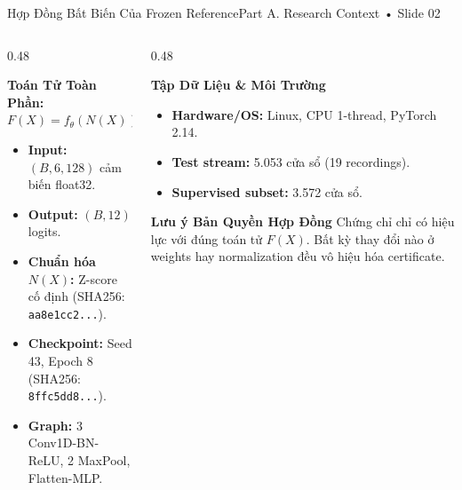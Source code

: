 \documentclass[aspectratio=169, 10pt]{beamer}
\begin{document}
\begin{frame}{Hợp Đồng Bất Biến Của Frozen Reference}{Part A. Research Context • Slide 02}
    \begin{columns}
        \begin{column}{0.48\textwidth}
            \begin{block}{\textbf{Toán Tử Toàn Phần: $F(X) = f_\theta(N(X))$}}
                \small
                \begin{itemize}
                    \item \textbf{Input:} $(B, 6, 128)$ cảm biến float32.
                    \item \textbf{Output:} $(B, 12)$ logits.
                    \item \textbf{Chuẩn hóa $N(X)$:} Z-score cố định (SHA256: \texttt{aa8e1cc2...}).
                    \item \textbf{Checkpoint:} Seed 43, Epoch 8 (SHA256: \texttt{8ffc5dd8...}).
                    \item \textbf{Graph:} 3 Conv1D-BN-ReLU, 2 MaxPool, Flatten-MLP.
                \end{itemize}
            \end{block}
        \end{column}
        \begin{column}{0.48\textwidth}
            \begin{block}{\textbf{Tập Dữ Liệu \& Môi Trường}}
                \small
                \begin{itemize}
                    \item \textbf{Hardware/OS:} Linux, CPU 1-thread, PyTorch 2.14.
                    \item \textbf{Test stream:} 5.053 cửa sổ (19 recordings).
                    \item \textbf{Supervised subset:} 3.572 cửa sổ.
                \end{itemize}
            \end{block}
            \vspace{0.2cm}
            \begin{alertblock}{\textbf{Lưu ý Bản Quyền Hợp Đồng}}
                Chứng chỉ chỉ có hiệu lực với đúng toán tử $F(X)$. Bất kỳ thay đổi nào ở weights hay normalization đều vô hiệu hóa certificate.
            \end{alertblock}
        \end{column}
    \end{columns}
\end{frame}
\end{document}
